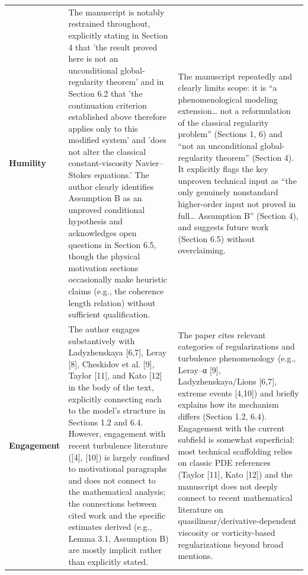 \documentclass[11pt]{article}
\begin{document}
\begin{longtable}{@{} p{2.2cm} p{6.3cm} p{6.3cm} @{}}
\rowcolor{rowgray}
\textbf{Humility} &
The manuscript is notably restrained throughout, explicitly stating in Section 4 that 'the result proved here is not an unconditional global-regularity theorem' and in Section 6.2 that 'the continuation criterion established above therefore applies only to this modified system' and 'does not alter the classical constant-viscosity Navier–Stokes equations.' The author clearly identifies Assumption B as an unproved conditional hypothesis and acknowledges open questions in Section 6.5, though the physical motivation sections occasionally make heuristic claims (e.g., the coherence length relation) without sufficient qualification. &
The manuscript repeatedly and clearly limits scope: it is “a phenomenological modeling extension… not a reformulation of the classical regularity problem” (Sections 1, 6) and “not an unconditional global-regularity theorem” (Section 4). It explicitly flags the key unproven technical input as “the only genuinely nonstandard higher-order input not proved in full… Assumption B” (Section 4), and suggests future work (Section 6.5) without overclaiming. \\[6pt]

\textbf{Engagement} &
The author engages substantively with Ladyzhenskaya [6,7], Leray [8], Cheskidov et al. [9], Taylor [11], and Kato [12] in the body of the text, explicitly connecting each to the model's structure in Sections 1.2 and 6.4. However, engagement with recent turbulence literature ([4], [10]) is largely confined to motivational paragraphs and does not connect to the mathematical analysis; the connections between cited work and the specific estimates derived (e.g., Lemma 3.1, Assumption B) are mostly implicit rather than explicitly stated. &
The paper cites relevant categories of regularizations and turbulence phenomenology (e.g., Leray–α [9], Ladyzhenskaya/Lions [6,7], extreme events [4,10]) and briefly explains how its mechanism differs (Section 1.2, 6.4). Engagement with the current subfield is somewhat superficial: most technical scaffolding relies on classic PDE references (Taylor [11], Kato [12]) and the manuscript does not deeply connect to recent mathematical literature on quasilinear/derivative-dependent viscosity or vorticity-based regularizations beyond broad mentions. \\[6pt]


\end{longtable}
\end{document}
